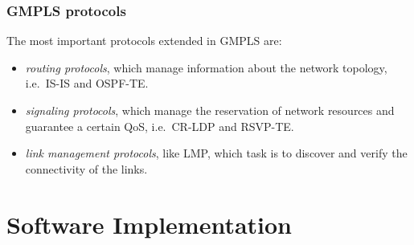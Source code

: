 \documentclass{beamer}
\begin{document}
\frame
{
  \frametitle{GMPLS protocols}
  
  The most important protocols extended in GMPLS are:
  \begin{itemize}
  \item \textit{routing protocols}, which manage information about the
    network topology, i.e.\ IS-IS and OSPF-TE.
  \item \textit{signaling protocols}, which manage the reservation of
    network resources and guarantee a certain QoS, i.e.\ CR-LDP and
    RSVP-TE.
  \item \textit{link management protocols}, like LMP, which task is to
    discover and verify the connectivity of the links. 
  \end{itemize}
}

\section{Software Implementation}
\end{document}
